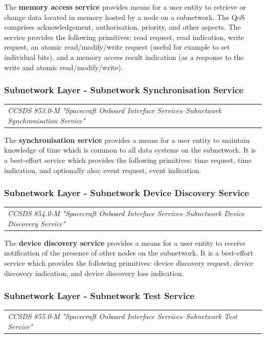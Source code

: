 The \textbf{memory access service} provides means for a user entity to retrieve or change data located in memory hosted by a node on a subnetwork. The QoS comprises acknowledgement, authorisation, priority, and other aspects. The service provides the following primitives: read request, read indication, write request, an atomic read/modify/write request (useful for example to set individual bits), and a memory access result indication (as a response to the write and atomic read/modify/write).

\subsubsection{Subnetwork Layer - Subnetwork Synchronisation Service}

\begin{tabular}{l}
\textit{CCSDS 853.0-M "Spacecraft Onboard Interface Services--Subnetwork Synchronisation Service" \cite{CCSDS 853.0-M}} 
\end{tabular}

The \textbf{synchronisation service} provides a means for a user entity to maintain knowledge of time which is common to all data systems on the subnetwork. It is a best-effort service which provides the following primitives: time request, time indication, and optionally also: event request, event indication.

\subsubsection{Subnetwork Layer - Subnetwork Device Discovery Service}

\begin{tabular}{l}
\textit{CCSDS 854.0-M "Spacecraft Onboard Interface Services--Subnetwork Device Discovery Service" \cite{CCSDS 854.0-M}} 
\end{tabular}

The \textbf{device discovery service} provides a means for a user entity to receive notification of the presence of other nodes on the subnetwork. It is a best-effort service which provides the following primitives: device discovery request, device discovery indication, and device discovery loss indication.

\subsubsection{Subnetwork Layer - Subnetwork Test Service}

\begin{tabular}{l}
\textit{CCSDS 855.0-M "Spacecraft Onboard Interface Services--Subnetwork Test Service" \cite{CCSDS 855.0-M}} 
\end{tabular}

